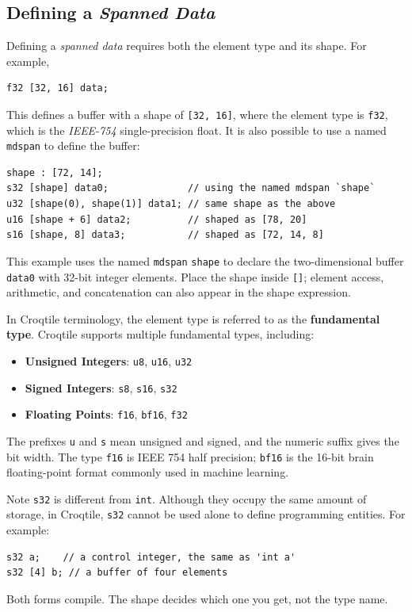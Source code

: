 \subsection*{Defining a \emph{Spanned Data}}

Defining a \emph{spanned data} requires both the element type and its shape. For example,

\begin{lstlisting}[language=croqtile,caption={A spanned-data declaration}]
f32 [32, 16] data;
\end{lstlisting}

This defines a buffer with a shape of \texttt{[32, 16]}, where the element type is \texttt{f32}, which is the \emph{IEEE-754} single-precision float. It is also possible to use a named \texttt{mdspan} to define the buffer:

\begin{lstlisting}[language=croqtile,caption={A standalone shape}]
shape : [72, 14];
s32 [shape] data0;              // using the named mdspan `shape`
u32 [shape(0), shape(1)] data1; // same shape as the above
u16 [shape + 6] data2;          // shaped as [78, 20]
s16 [shape, 8] data3;           // shaped as [72, 14, 8]
\end{lstlisting}

This example uses the named \texttt{mdspan} \texttt{shape} to declare the two-dimensional buffer \texttt{data0} with 32-bit integer elements. Place the shape inside \texttt{[]}; element access, arithmetic, and concatenation can also appear in the shape expression.

In Croqtile terminology, the element type is referred to as the \textbf{fundamental type}. Croqtile supports multiple fundamental types, including:

\begin{itemize}[leftmargin=1.6em]
\item \textbf{Unsigned Integers}: \texttt{u8}, \texttt{u16}, \texttt{u32}
\item \textbf{Signed Integers}: \texttt{s8}, \texttt{s16}, \texttt{s32}
\item \textbf{Floating Points}: \texttt{f16}, \texttt{bf16}, \texttt{f32}
\end{itemize}

The prefixes \texttt{u} and \texttt{s} mean unsigned and signed, and the numeric suffix gives the bit width. The type \texttt{f16} is IEEE 754 half precision; \texttt{bf16} is the 16-bit brain floating-point format commonly used in machine learning.

Note \texttt{s32} is different from \texttt{int}. Although they occupy the same amount of storage, in Croqtile, \texttt{s32} cannot be used alone to define programming entities. For example:

\begin{lstlisting}[language=croqtile,caption={Element type without a shape}]
s32 a;    // a control integer, the same as 'int a'
s32 [4] b; // a buffer of four elements
\end{lstlisting}

Both forms compile. The shape decides which one you get, not the type name.
